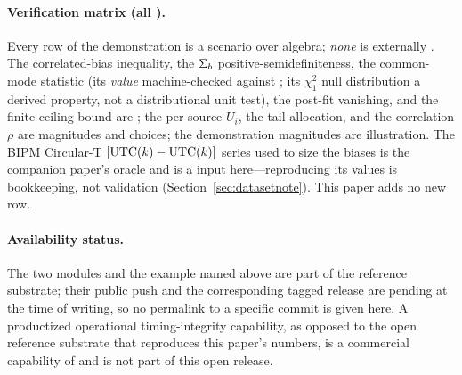 \paragraph{Verification matrix (all \Modelled{}).}
Every row of the demonstration is a \Modelled{} scenario over \Proven{} algebra;
\emph{none} is externally \Validated{}. The correlated-bias inequality, the
$\Sigma_{b}{}$ positive-semidefiniteness, the common-mode statistic (its \emph{value}
machine-checked against ; its $\chi^2_1$ null distribution a \Proven{}
derived property, not a distributional unit test), the post-fit vanishing, and the
finite-ceiling bound are \Proven{}; the per-source $U_i$, the tail allocation, and
the correlation $\rho$ are \Cited{} magnitudes and \Modelled{} choices; the
demonstration magnitudes are \Modelled{} illustration. The BIPM Circular-T $[\mathrm{UTC}(k){}-\mathrm{UTC}(k){}]$ series
\citep{bipmcirculart} used to size the biases is the companion paper's
\Validated{} oracle and is a \Cited{} input here---reproducing its values is
bookkeeping, not validation (Section~\ref{sec:datasetnote}). This paper adds no new
\Validated{} row.

\paragraph{Availability status.}
The two modules and the example named above are part of the  reference
substrate; their public push and the corresponding tagged release are pending at
the time of writing, so no permalink to a specific commit is given here. A
productized operational timing-integrity capability, as opposed to the open
reference substrate that reproduces this paper's numbers, is a commercial capability
of  and is not part of this open release.
